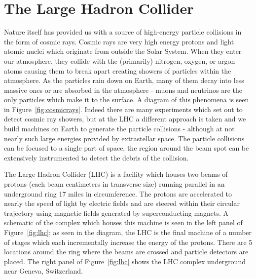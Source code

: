 \chapter{The Large Hadron Collider}
\label{chap:lhc}

Nature itself has provided us with a source of high-energy particle collisions in the form of cosmic rays. Cosmic rays are very high energy protons and light atomic nuclei which originate from outside the Solar System. When they enter our atmosphere, they collide with the (primarily) nitrogen, oxygen, or argon atoms causing them to break apart creating showers of particles within the atmosphere. As the particles rain down on Earth, many of them decay into less massive ones or are absorbed in the atmosphere - muons and neutrinos are the only particles which make it to the surface. A diagram of this phenomena is seen in Figure~\ref{fig:cosmicrays}. Indeed there are many experiments which set out to detect cosmic ray showers, but at the LHC a different approach is taken and we build machines on Earth to generate the particle collisions - although at not nearly such large energies provided by extrastellar space. The particle collisions can be focused to a single part of space, the region around the beam spot can be extensively instrumented to detect the debris of the collision. 

The Large Hadron Collider (LHC) is a facility which houses two beams of protons (each beam centimeters in transverse size) running parallel in an underground ring 17 miles in circumference. The protons are accelerated to nearly the speed of light by electric fields and are steered within their circular trajectory using magnetic fields generated by superconducting magnets. A schematic of the complex which houses this machine is seen in the left panel of Figure~\ref{fig:lhc}; as seen in the diagram, the LHC is the final machine of a number of stages which each incrementally increase the energy of the protons. There are 5 locations around the ring where the beams are crossed and particle detectors are placed. The right panel of Figure~\ref{fig:lhc} shows the LHC complex underground near Geneva, Switzerland.

